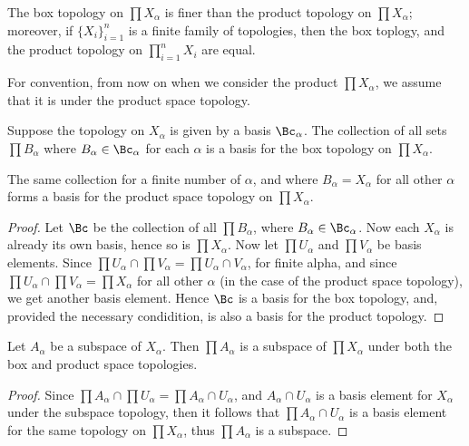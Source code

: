 \begin{corollary}
    The box topology on $\prod{X_{\alpha}}$ is finer than the product topology on
    $\prod{X_{\alpha}}$; moreover, if $\{X_{i}\}_{i=1}^{n}$ is a finite  family of topologies, then
    the box toplogy, and the product topology on $\prod_{i=1}^{n}{X_i}$ are equal.
\end{corollary}

For convention, from now on when we consider the product $\prod{X_{\alpha}}$, we assume that it is
under the product space topology.

\begin{theorem}\label{2.1.4}
    Suppose the topology on $X_{\alpha}$ is given by a basis $\Bc_{\alpha}$. The collection of all
    sets $\prod{B_{\alpha}}$ where $B_{\alpha} \in \Bc_{\alpha}$ for each $\alpha$ is a basis for
    the box topology on  $\prod{X_{\alpha}}$.

    The same collection for a finite number of $\alpha$, and where  $B_{\alpha}=X_{\alpha}$ for all
    other $\alpha$ forms a basis for the product space topology on  $\prod{X_{\alpha}}$.
\end{theorem}
\begin{proof}
    Let $\Bc$ be the collection of all  $\prod{B_{\alpha}}$, where $B_{\alpha} \in \Bc_{\alpha}$.
    Now each $X_{\alpha}$ is already its own basis, hence so is $\prod{X_{\alpha}}$. Now let
    $\prod{U_{\alpha}}$ and $\prod{V_{\alpha}}$ be basis elements. Since $\prod{U_{\alpha}} \cap 
    \prod{V_{\alpha}}=\prod{U_{\alpha} \cap V_{\alpha}}$, for finite alpha, and since 
    $\prod{U_{\alpha}} \cap \prod{V_{\alpha}}=\prod{X_{\alpha}}$ for all other $\alpha$  (in the
    case of the product space topology), we get another basis element. Hence $\Bc$ is a basis for
    the box topology, and, provided the necessary condidition, is also a basis for the product
    topology.
\end{proof}

\begin{theorem}\label{2.1.5}
    Let $A_{\alpha}$ be a subspace of $X_{\alpha}$. Then $\prod{A_{\alpha}}$ is a subspace of
    $\prod{X_{\alpha}}$ under both the box and product space topologies.
\end{theorem}
\begin{proof}
   Since $\prod{A_{\alpha}} \cap \prod{U_{\alpha}}=\prod{A_\alpha} \cap U_{\alpha}$, and $A_{\alpha}
   \cap U_{\alpha}$ is a basis element for $X_ {\alpha}$ under the subspace topology, then it follows that
   $\prod{A_{\alpha} \cap U_{\alpha}}$ is a basis element for the same topology on
   $\prod{X_{\alpha}}$, thus $\prod{A_\alpha}$ is a subspace.
\end{proof}

